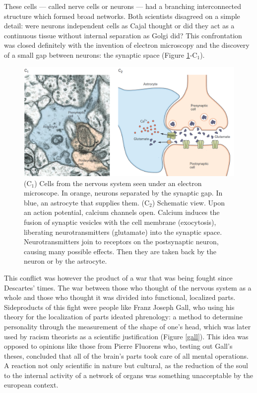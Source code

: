 These cells --- called nerve cells or neurons --- had a branching interconnected structure which formed broad networks. Both scientists disagreed on a simple detail: were neurons independent cells as Cajal thought or did they act as a continuous tissue without internal separation as Golgi did? This confrontation was closed definitely with the invention of electron microscopy and the discovery of a small gap between neurons: the synaptic space (Figure \ref{synapse}-C$_1$).

\begin{figure}[H]
	\centering

	\includegraphics[width=\linewidth]{media/3-synapse.png}
	\caption{(C$_1$) Cells from the nervous system seen under an electron microscope. In orange, neurons separated by the synaptic gap. In blue, an astrocyte that supplies them. (C$_2$) Schematic view. Upon an action potential, calcium channels open. Calcium induces the fusion of synaptic vesicles with the cell membrane (exocytosis), liberating neurotransmitters (glutamate) into the synaptic space. Neurotransmitters join to receptors on the postsynaptic neuron, causing many possible effects. Then they are taken back by the neuron or by the astrocyte.}
	\label{synapse}
\end{figure}

This conflict was however the product of a war that was being fought since Descartes' times. The war between those who thought of the nervous system as a whole and those who thought it was divided into functional, localized parts. Sideproducts of this fight were people like Franz Joseph Gall, who using his theory for the localization of parts ideated phrenology: a method to determine personality through the measurement of the shape of one's head, which was later used by racism theorists as a scientific justification (Figure \ref{gall}). This idea was opposed to opinions like those from Pierre Fluorens who, testing out Gall's theses, concluded that all of the brain's parts took care of all mental operations. A reaction not only scientific in nature but cultural, as the reduction of the soul to the internal activity of a network of organs was something unacceptable by the european context.


